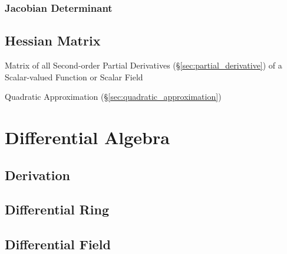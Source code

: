 \subsubsection{Jacobian Determinant}\label{sec:jacobian_determinant}



\subsection{Hessian Matrix}\label{sec:hessian_matrix}


Matrix of all Second-order Partial Derivatives (\S\ref{sec:partial_derivative})
of a Scalar-valued Function or Scalar Field

\fist Quadratic Approximation (\S\ref{sec:quadratic_approximation})



\section{Differential Algebra}\label{sec:differential_algebra}

\subsection{Derivation}\label{sec:derivation}

\subsection{Differential Ring}\label{sec:differential_ring}

\subsection{Differential Field}\label{sec:differential_field}

